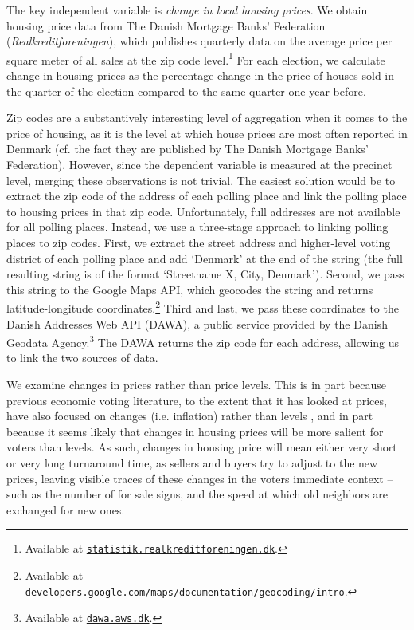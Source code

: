 \documentclass[12pt,a4paper]{article}
\begin{document}
The key independent variable is \textit{change in local housing prices}. We obtain housing price data from The Danish Mortgage Banks' Federation (\textit{Realkreditforeningen}), which publishes quarterly data on the average price per square meter of all sales at the zip code level.\footnote{Available at \texttt{\href{http://statistik.realkreditforeningen.dk/}{statistik.realkreditforeningen.dk}}.} For each election, we calculate change in housing prices as the percentage change in the price of houses sold in the quarter of the election compared to the same quarter one year before. 

Zip codes are a substantively interesting level of aggregation when it comes to the price of housing, as it is the level at which house prices are most often reported in Denmark (cf. the fact they are published by The Danish Mortgage Banks' Federation). However, since the dependent variable is measured at the precinct level, merging these observations is not trivial. The easiest solution would be to extract the zip code of the address of each polling place and link the polling place to housing prices in that zip code. Unfortunately, full addresses are not available for all polling places. Instead, we use a three-stage approach to linking polling places to zip codes. First, we extract the street address and higher-level voting district of each polling place and add `Denmark' at the end of the string (the full resulting string is of the format `Streetname X, City, Denmark'). Second, we pass this string to the Google Maps API, which geocodes the string and returns latitude-longitude coordinates.\footnote{Available at \texttt{\href{https://developers.google.com/maps/documentation/geocoding/intro}{developers.google.com/maps/documentation/geocoding/intro}}.} Third and last, we pass these coordinates to the Danish Addresses Web API (DAWA), a public service provided by the Danish Geodata Agency.\footnote{Available at \texttt{\href{http://dawa.aws.dk/}{dawa.aws.dk}}.} The DAWA returns the zip code for each address, allowing us to link the two sources of data. %

We examine changes in prices rather than price levels. This is in part because previous economic voting literature, to the extent that it has looked at prices, have also focused on changes (i.e. inflation) rather than levels \citep[cf.][]{kramer1971short}, and in part because it seems likely that changes in housing prices will be more salient for voters than levels. As such, changes in housing price will mean either very short or very long turnaround time, as sellers and buyers try to adjust to the new prices, leaving visible traces of these changes in the voters immediate context -- such as the number of for sale signs, and the speed at which old neighbors are exchanged for new ones.
\end{document}
